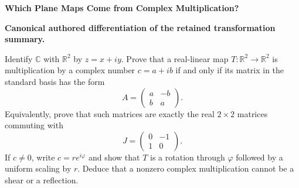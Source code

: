 \begin{problem}[CP-I-0081]
\label{prob:cp-i-0081}
\textbf{Which Plane Maps Come from Complex Multiplication?}

\textbf{Canonical authored differentiation of the retained transformation summary.}

\hspace*{1.5em}Identify \(\mathbb C\) with \(\mathbb R^2\) by \(z=x+iy\). Prove that a real-linear
map \(T:\mathbb R^2\to\mathbb R^2\) is multiplication by a complex number \(c=a+ib\) if and
only if its matrix in the standard basis has the form
\[
A=
\begin{pmatrix}
a&-b\\
b&a
\end{pmatrix}.
\]
Equivalently, prove that such matrices are exactly the real \(2\times2\) matrices commuting with
\[
J=
\begin{pmatrix}
0&-1\\
1&0
\end{pmatrix}.
\]
If \(c\neq0\), write \(c=re^{i\varphi}\) and show that \(T\) is a rotation through \(\varphi\)
followed by a uniform scaling by \(r\). Deduce that a nonzero complex multiplication cannot be
a shear or a reflection.
\end{problem}

